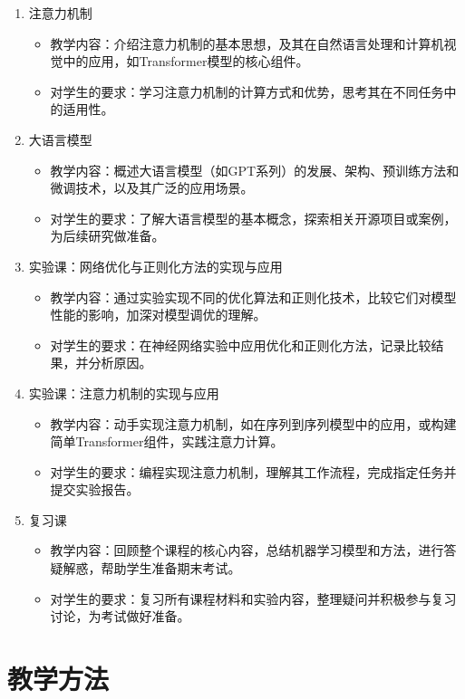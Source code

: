 \documentclass{../nndlcourse}
\begin{document}
\begin{enumerate}
\item 注意力机制
\begin{itemize}
    \item 教学内容：介绍注意力机制的基本思想，及其在自然语言处理和计算机视觉中的应用，如Transformer模型的核心组件。
    \item 对学生的要求：学习注意力机制的计算方式和优势，思考其在不同任务中的适用性。
\end{itemize}

\item 大语言模型
\begin{itemize}
    \item 教学内容：概述大语言模型（如GPT系列）的发展、架构、预训练方法和微调技术，以及其广泛的应用场景。
    \item 对学生的要求：了解大语言模型的基本概念，探索相关开源项目或案例，为后续研究做准备。
\end{itemize}

\item 实验课：网络优化与正则化方法的实现与应用
\begin{itemize}
    \item 教学内容：通过实验实现不同的优化算法和正则化技术，比较它们对模型性能的影响，加深对模型调优的理解。
    \item 对学生的要求：在神经网络实验中应用优化和正则化方法，记录比较结果，并分析原因。
\end{itemize}

\item 实验课：注意力机制的实现与应用
\begin{itemize}
    \item 教学内容：动手实现注意力机制，如在序列到序列模型中的应用，或构建简单Transformer组件，实践注意力计算。
    \item 对学生的要求：编程实现注意力机制，理解其工作流程，完成指定任务并提交实验报告。
\end{itemize}

\item 复习课
\begin{itemize}
    \item 教学内容：回顾整个课程的核心内容，总结机器学习模型和方法，进行答疑解惑，帮助学生准备期末考试。
    \item 对学生的要求：复习所有课程材料和实验内容，整理疑问并积极参与复习讨论，为考试做好准备。
\end{itemize}


\end{enumerate}
	
\section*{教学方法}
\end{document}
